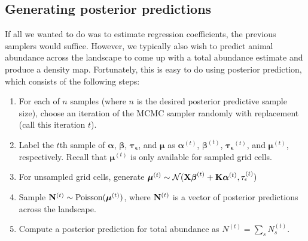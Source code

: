 \documentclass[12pt,fleqn]{article}
\begin{document}
\begin{flushleft}
\subsection{Generating posterior predictions}
If all we wanted to do was to estimate regression coefficients, the previous samplers would suffice.  However, we typically also wish to predict animal abundance across the landscape to come up with a total abundance estimate and produce a density map.  Fortunately, this is easy to do using posterior prediction, which consists of the following steps:
\begin{enumerate}
\item For each of $n$ samples (where $n$ is the desired posterior predictive sample size), choose an iteration of the MCMC sampler randomly with replacement (call this iteration $t$).
\item Label the $t$th sample of $\boldsymbol{\alpha}$, $\boldsymbol{\beta}$, $\boldsymbol{\tau_\epsilon}$, and $\boldsymbol{\mu}$ as $\boldsymbol{\alpha}^{(t)}$, $\boldsymbol{\beta}^{(t)}$, $\boldsymbol{\tau_\epsilon}^{(t)}$, and $\boldsymbol{\mu}^{(t)}$, respectively.  Recall that $\boldsymbol{\mu}^{(t)}$ is only available for sampled grid cells.
\item For unsampled grid cells, generate $\boldsymbol{\mu}^{(t)} \sim \mathcal{N}({\bf X}\boldsymbol{\beta}^{(t)}+{\bf K}\boldsymbol{\alpha}^{(t)},\tau_\epsilon^{(t)})$
\item Sample ${\bf N}^{(t)} \sim \text{Poisson}(\boldsymbol{\mu}^{(t)})$, where ${\bf N}^{(t)}$ is a vector of posterior predictions across the landscape.
\item Compute a posterior prediction for total abundance as $N^{(t)}=\sum_s N_s^{(t)}$.
\end{enumerate}

\renewcommand{\refname}{Literature Cited}




\end{flushleft}
\end{document}
